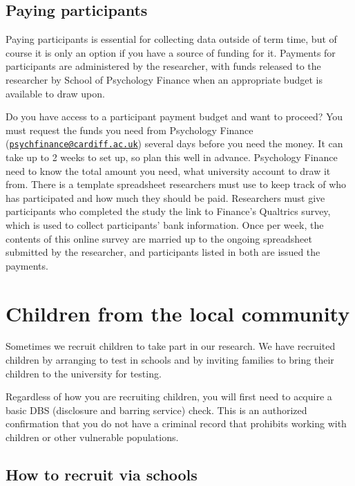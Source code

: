 \documentclass[
  12pt,
]{book}
\begin{document}
\subsection{Paying participants}\label{paying-participants}

Paying participants is essential for collecting data outside of term time, but of course it is only an option if you have a source of funding for it. Payments for participants are administered by the researcher, with funds released to the researcher by School of Psychology Finance when an appropriate budget is available to draw upon.

Do you have access to a participant payment budget and want to proceed? You must request the funds you need from Psychology Finance (\href{mailto:psychfinance@cardiff.ac.uk}{\nolinkurl{psychfinance@cardiff.ac.uk}}) several days before you need the money. It can take up to 2 weeks to set up, so plan this well in advance. Psychology Finance need to know the total amount you need, what university account to draw it from. There is a template spreadsheet researchers must use to keep track of who has participated and how much they should be paid. Researchers must give participants who completed the study the link to Finance's Qualtrics survey, which is used to collect participants' bank information. Once per week, the contents of this online survey are married up to the ongoing spreadsheet submitted by the researcher, and participants listed in both are issued the payments.

\section{Children from the local community}\label{children-from-the-local-community}

Sometimes we recruit children to take part in our research. We have recruited children by arranging to test in schools and by inviting families to bring their children to the university for testing.

Regardless of how you are recruiting children, you will first need to acquire a basic DBS (disclosure and barring service) check. This is an authorized confirmation that you do not have a criminal record that prohibits working with children or other vulnerable populations.

\subsection{How to recruit via schools}\label{how-to-recruit-via-schools}
\end{document}
